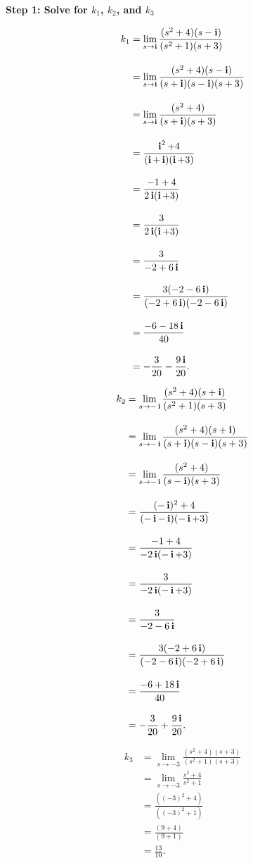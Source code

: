 \begin{enumerate}
\textbf{Step 1: Solve for \(k_1\), \(k_2\), and \(k_3\)}



\[
\begin{aligned}
k_1 &= \lim_{s \to \im} \frac{(s^2 + 4)(s - \im)}{(s^2 + 1)(s + 3)} \\[1em]
&=  \lim_{s \to \im} \frac{(s^2 + 4)(s - \im)}{(s + \im)(s - \im)(s + 3)} \\[1em]
&= \lim_{s \to \im} \frac{(s^2 + 4)}{(s + \im)(s + 3)} \\[1em]
&= \frac{\im^2 + 4}{(\im + \im)(\im + 3)} \\[1em]
&= \frac{-1 + 4}{2\im (\im + 3)} \\[1em]
&= \frac{3}{2 \im (\im + 3)} \\[1em]
&= \frac{3}{-2 + 6 \im} \\[1em]
&= \frac{3(-2 - 6 \im)}{(-2 + 6 \im)(-2 - 6 \im)} \\[1em]
&= \frac{-6 - 18 \im}{40} \\[1em]
&= -\frac{3}{20} - \frac{9 \im}{20}.
\end{aligned}
\]

\[
\begin{aligned}
k_2 &= \lim_{s \to -\im} \frac{(s^2 + 4)(s + \im)}{(s^2 + 1)(s + 3)} \\[1em]
&=  \lim_{s \to -\im} \frac{(s^2 + 4)(s + \im)}{(s + \im)(s - \im)(s + 3)} \\[1em]
&= \lim_{s \to -\im} \frac{(s^2 + 4)}{(s - \im)(s + 3)} \\[1em]
&= \frac{(-\im)^2 + 4}{(-\im - \im)(-\im + 3)} \\[1em]
&= \frac{-1 + 4}{-2 \im (-\im + 3)} \\[1em]
&= \frac{3}{-2 \im (-\im + 3)} \\[1em]
&= \frac{3}{-2 - 6 \im} \\[1em]
&= \frac{3(-2 + 6 \im)}{(-2 - 6 \im)(-2 + 6 \im)} \\[1em]
&= \frac{-6 + 18 \im}{40} \\[1em]
&= -\frac{3}{20} + \frac{9 \im}{20}.
\end{aligned}
\]


\[
\begin{aligned}
k_3 &= \lim_{s \to -3} \frac{(s^2 + 4)(s + 3)}{(s^2 + 1)(s + 3)} \\[1em]
&= \lim_{s \to -3} \frac{s^2 + 4}{s^2 + 1} \\[1em]
&= \frac{((-3)^2 + 4)}{((-3)^2 + 1)} \\[1em]
&= \frac{(9 + 4)}{(9 + 1)} \\[1em]
&= \frac{13}{10}.
\end{aligned}
\]


\end{enumerate}
